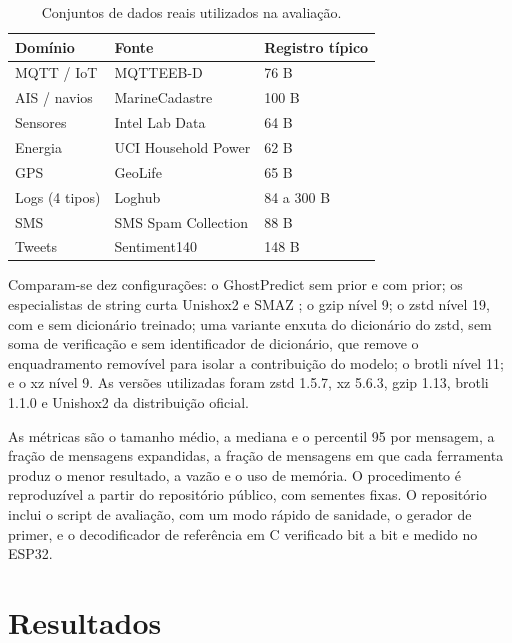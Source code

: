 \documentclass[12pt]{article}
\begin{document}
\begin{table}[ht]
\centering
\caption{Conjuntos de dados reais utilizados na avaliação.}
\label{tab:datasets}
\begin{tabular}{lll}
\toprule
\textbf{Domínio} & \textbf{Fonte} & \textbf{Registro típico} \\
\midrule
MQTT / IoT & MQTTEEB-D \cite{aqachtoul:25} & 76 B \\
AIS / navios & MarineCadastre \cite{marinecadastre:25} & 100 B \\
Sensores & Intel Lab Data \cite{bodik:04} & 64 B \\
Energia & UCI Household Power \cite{hebrail:12} & 62 B \\
GPS & GeoLife \cite{zheng:09} & 65 B \\
Logs (4 tipos) & Loghub \cite{zhu:23} & 84 a 300 B \\
SMS & SMS Spam Collection \cite{almeida:11} & 88 B \\
Tweets & Sentiment140 \cite{go:09} & 148 B \\
\bottomrule
\end{tabular}
\end{table}

Comparam-se dez configurações: o GhostPredict sem prior e com prior; os
especialistas de string curta Unishox2 e SMAZ \cite{sanfilippo:smaz}; o gzip nível 9; o zstd nível 19,
com e sem dicionário treinado; uma variante enxuta do dicionário do zstd, sem
soma de verificação e sem identificador de dicionário, que remove o
enquadramento removível para isolar a contribuição do modelo; o brotli nível 11;
e o xz nível 9. As versões utilizadas foram zstd 1.5.7, xz 5.6.3, gzip 1.13,
brotli 1.1.0 e Unishox2 da distribuição oficial.

As métricas são o tamanho médio, a mediana e o percentil 95 por mensagem, a
fração de mensagens expandidas, a fração de mensagens em que cada ferramenta
produz o menor resultado, a vazão e o uso de memória. O procedimento é
reproduzível a partir do repositório público, com sementes fixas. O repositório
inclui o script de avaliação, com um modo rápido de sanidade, o gerador de
primer, e o decodificador de referência em C verificado bit a bit e medido no
ESP32.

\section{Resultados}
\label{sec:resultados}
\end{document}
